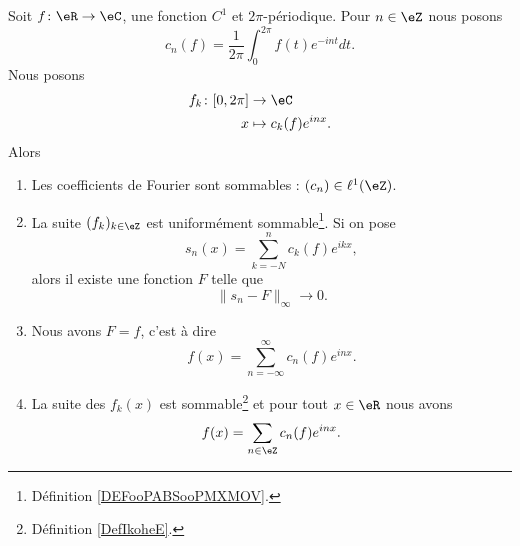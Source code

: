 \begin{theorem}     \label{ThozHXraQ}
	Soit \( f\colon \eR\to \eC\), une fonction \( C^1\) et \( 2\pi\)-périodique. Pour \( n\in \eZ\) nous posons
	\begin{equation}
		c_n(f)=\frac{1}{ 2\pi }\int_0^{2\pi}f(t) e^{-int}dt.
	\end{equation}
	Nous posons
	\begin{equation}
		\begin{aligned}
			f_k\colon \mathopen[ 0,2\pi\mathclose] & \to \eC                \\
			x                                      & \mapsto c_k(f)e^{inx}.
		\end{aligned}
	\end{equation}
	Alors
	\begin{enumerate}
		\item       \label{ITEMooIDVEooJdMEmU}
		      Les coefficients de Fourier sont sommables : \( (c_n)\in \ell^1(\eZ)\).
		\item       \label{ITEMooAUCTooTgJEPv}
		      La suite \( (f_k)_{k\in \eZ}\) est uniformément sommable\footnote{Définition \ref{DEFooPABSooPMXMOV}.}. Si on pose
		      \begin{equation}
			      s_n(x)=\sum_{k=-N}^nc_k(f) e^{ikx},
		      \end{equation}
		      alors il existe une fonction \( F\) telle que
		      \begin{equation}
			      \| s_n-F \|_{\infty}\to 0.
		      \end{equation}
		\item		\label{ITEMooSHZXooMZtdJU}
		      Nous avons \( F=f\), c'est à dire
		      \begin{equation}
			      f(x)=\sum_{n=-\infty}^{\infty}c_n(f) e^{inx}.
		      \end{equation}
		\item       \label{ITEMooGIEUooKLyXej}
		      La suite des \( f_k(x)\) est sommable\footnote{Définition \ref{DefIkoheE}.} et pour tout \( x\in \eR\) nous avons
		      \begin{equation}
			      f(x)=\sum_{n\in \eZ}c_n(f) e^{inx}.
		      \end{equation}
	\end{enumerate}
\end{theorem}

